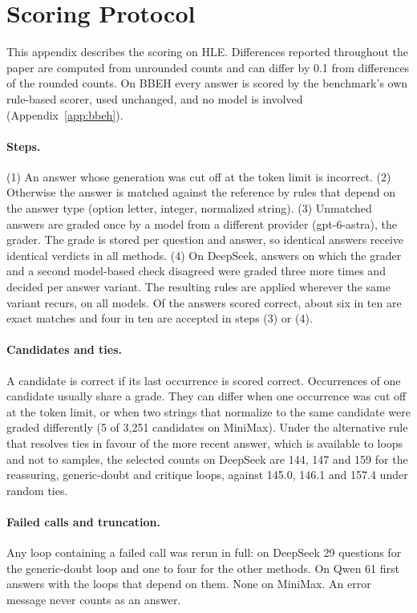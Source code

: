 \documentclass[11pt]{article}
\newcommand{\ds}{DeepSeek}
\newcommand{\qw}{Qwen}
\newcommand{\mm}{MiniMax}
\begin{document}
\section{Scoring Protocol}
\label{app:scoring}

This appendix describes the scoring on HLE. Differences reported throughout the paper are computed from unrounded counts and can differ by 0.1 from differences of the rounded counts. On BBEH every answer is scored by the benchmark's own rule-based scorer, used unchanged, and no model is involved (Appendix~\ref{app:bbeh}).

\paragraph{Steps.}
(1) An answer whose generation was cut off at the token limit is incorrect.
(2) Otherwise the answer is matched against the reference by rules that depend on the answer type (option letter, integer, normalized string).
(3) Unmatched answers are graded once by a model from a different provider (gpt-6-astra), the grader. The grade is stored per question and answer, so identical answers receive identical verdicts in all methods.
(4) On \ds, answers on which the grader and a second model-based check disagreed were graded three more times and decided per answer variant. The resulting rules are applied wherever the same variant recurs, on all models.
Of the answers scored correct, about six in ten are exact matches and four in ten are accepted in steps (3) or (4).

\paragraph{Candidates and ties.}
A candidate is correct if its last occurrence is scored correct.
Occurrences of one candidate usually share a grade. They can differ when one occurrence was cut off at the token limit, or when two strings that normalize to the same candidate were graded differently (5 of 3{,}251 candidates on \mm).
Under the alternative rule that resolves ties in favour of the more recent answer, which is available to loops and not to samples, the selected counts on \ds{} are 144, 147 and 159 for the reassuring, generic-doubt and critique loops, against 145.0, 146.1 and 157.4 under random ties.

\paragraph{Failed calls and truncation.}
Any loop containing a failed call was rerun in full: on \ds{} 29 questions for the generic-doubt loop and one to four for the other methods. On \qw{} 61 first answers with the loops that depend on them. None on \mm.
An error message never counts as an answer.
\end{document}
